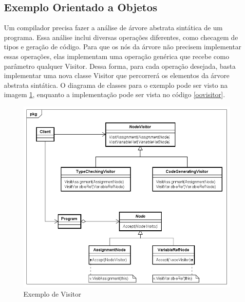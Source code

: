 \subsection*{Exemplo Orientado a Objetos}

Um compilador precisa fazer a análise de árvore abstrata sintática de 
um programa. Essa análise inclui diversas operações diferentes, como 
checagem de tipos e geração de código. Para que os nós da árvore 
não precisem implementar essas operações, elas implementam uma operação 
genérica que recebe como parâmetro qualquer Visitor. Dessa forma, para 
cada operação desejada, basta implementar uma nova classe Visitor 
que percorrerá os elementos da árvore abstrata sintática. O diagrama 
de classes para o exemplo pode ser visto na imagem \ref{visitor_exemplo1}, 
enquanto a implementação pode ser vista no código \ref{oovisitor}.

\begin{figure}[htb]
	\caption{\label{visitor_exemplo1}Exemplo de Visitor}
	\begin{center}
	    \includegraphics[scale=0.5]{5_padroes-contexto-funcional/5.3_comportamentais/5.3.11_visitor/visitor_exemplo.png}
	\end{center}
\end{figure}

